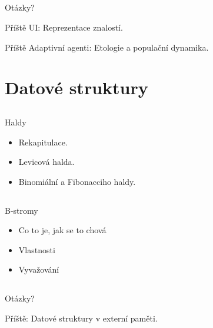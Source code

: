 \documentclass{beamer}
\begin{document}
\subsection{}
\begin{frame}{Otázky?}
\begin{center}
Příště UI: Reprezentace znalostí.

Příště Adaptivní agenti: Etologie a populační dynamika.
\end{center}
\end{frame}

\section{Datové struktury}

\subsection{}
\begin{frame}{Haldy}
\begin{itemize}
\item Rekapitulace.
\item Levicová halda.
\item Binomiální a Fibonacciho haldy.
\end{itemize}
\end{frame}

\subsection{}
\begin{frame}{B-stromy}
\begin{itemize}
\item Co to je, jak se to chová
\item Vlastnosti
\item Vyvažování
\end{itemize}
\end{frame}

\subsection{}
\begin{frame}{Otázky?}
\begin{center}
Příště: Datové struktury v externí paměti.
\end{center}
\end{frame}

\subsection{}
\end{document}
